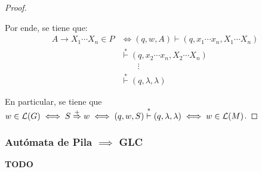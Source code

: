 \begin{proof}
\begin{itemize}
            Por ende, se tiene que:
            $$
            \begin{aligned}
                A \to X_1 \cdots X_n \in P & \iff (q, w, A) \vdash (q, x_1 \cdots x_n, X_1 \cdots X_n) \\
                & \overset{*}{\vdash} (q, x_2 \cdots x_n, X_2 \cdots X_n) \\
                & \qquad \vdots \\
                & \overset{*}{\vdash} (q, \lambda, \lambda)
            \end{aligned}
            $$
    \end{itemize}

    En particular, se tiene que $w \in \mathcal{L}(G) \iff S \overset{+}{\Rightarrow} w \iff (q, w, S) \overset{*}{\vdash} (q, \lambda, \lambda) \iff w \in \mathcal{L}(M)$.
\end{proof}

\subsubsection{Autómata de Pila $\implies$ GLC}

\textbf{TODO}
